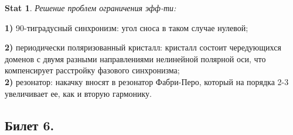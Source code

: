 \documentclass[a4paper,12pt]{article}
\theoremstyle{definition} %
\newtheorem{Stat}{Stat}[section]
\theoremstyle{definition} %
\theoremstyle{remark} %
\begin{document}
\begin{Stat}\label{stat \theStat}
	\textit{Решение проблем ограничения эфф-ти:} \\
	\par \textbf{1)} 90-тиградусный синхронизм: угол сноса в таком случае нулевой; \\
	\par \textbf{2)} периодически поляризованный кристалл: кристалл состоит чередующихся доменов с двумя разными направлениями нелинейной полярной оси, что компенсирует расстройку фазового синхронизма; \\
	\quad \textbf{2)} резонатор: накачку вносят в резонатор Фабри-Перо, который на порядка 2-3 увеличивает ее, как и вторую гармонику.
\end{Stat}

\subsection{Билет 6.}
\end{document}
